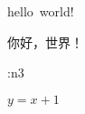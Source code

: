 \documentclass{zlhywlfbook}
\begin{document}
\ExplSyntaxOn

hello~world! \par

你好，世界！\par

\factorial:n{3} \par

$y=x+1$

\ExplSyntaxOff
\end{document}
